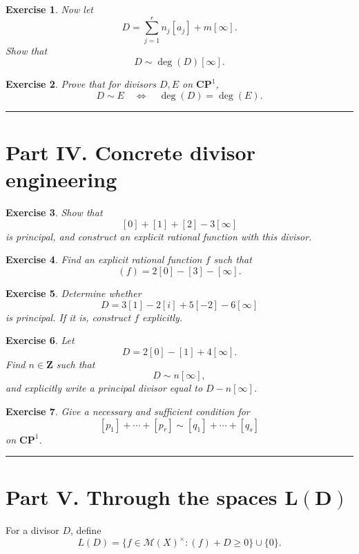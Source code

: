 \documentclass[11pt]{article}
\newtheorem{exercise}{Exercise}
\newcommand{\CP}{\mathbf{CP}^1}
\newcommand{\MM}{\mathcal{M}}
\begin{document}
	\begin{exercise}
		Now let
		\[
		D=\sum_{j=1}^r n_j[a_j]+m[\infty].
		\]
		Show that
		\[
		D\sim \deg(D)[\infty].
		\]
	\end{exercise}
	
	\begin{exercise}
		Prove that for divisors \(D,E\) on \(\CP\),
		\[
		D\sim E \quad\Longleftrightarrow\quad \deg(D)=\deg(E).
		\]
	\end{exercise}
	
	\hrule
	\bigskip
	
	\section*{Part IV. Concrete divisor engineering}
	
	\begin{exercise}
		Show that
		\[
		[0]+[1]+[2]-3[\infty]
		\]
		is principal, and construct an explicit rational function with this divisor.
	\end{exercise}
	
	\begin{exercise}
		Find an explicit rational function \(f\) such that
		\[
		(f)=2[0]-[3]-[\infty].
		\]
	\end{exercise}
	
	\begin{exercise}
		Determine whether
		\[
		D=3[1]-2[i]+5[-2]-6[\infty]
		\]
		is principal. If it is, construct \(f\) explicitly.
	\end{exercise}
	
	\begin{exercise}
		Let
		\[
		D=2[0]-[1]+4[\infty].
		\]
		Find \(n\in\mathbf{Z}\) such that
		\[
		D\sim n[\infty],
		\]
		and explicitly write a principal divisor equal to \(D-n[\infty]\).
	\end{exercise}
	
	\begin{exercise}
		Give a necessary and sufficient condition for
		\[
		[p_1]+\cdots+[p_r]\sim [q_1]+\cdots+[q_s]
		\]
		on \(\CP\).
	\end{exercise}
	
	\hrule
	\bigskip
	
	\section*{Part V. Through the spaces \(\boldsymbol{L(D)}\)}
	
	For a divisor \(D\), define
	\[
	L(D)=\{f\in \MM(X)^\times : (f)+D\ge 0\}\cup \{0\}.
	\]
	
\end{document}
